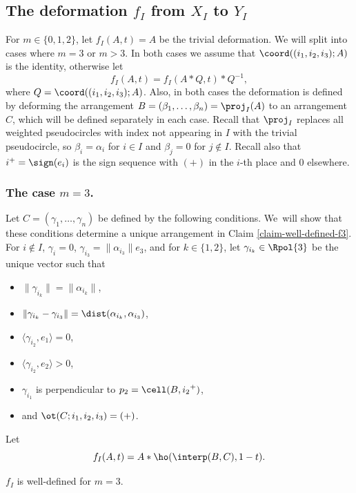 \subsection{The deformation $f_I$ from $X_I$ to $Y_I$}
\label{subsubsec-f}

For $m \in \{0,1,2\}$, let $f_I(A,t) = A$ be the trivial deformation.
We will split into cases where $m=3$ or $m >3$.
In both cases we assume that $\coord((i_1,i_2,i_3);A)$ is the identity, otherwise let
\[
f_I(A,t) = f_I(A*Q,t)*Q^{-1},
\]
where $Q = \coord((i_1,i_2,i_3);A)$.
Also, in both cases the deformation is defined by deforming the arrangement $B = (\beta_1,\dots,\beta_n) = \proj_I(A)$ to an arrangement $C$, which will be defined separately in each case. Recall that $\proj_I$ replaces all weighted pseudocircles with index not appearing in $I$ with the trivial pseudocircle, so $\beta_i = \alpha_i$ for $i \in I$ and $\beta_j = 0$ for $j \not\in I$.
Recall also that $i^+ = \sign(e_i)$ is the sign sequence with $(+)$ in the $i$-th place and $0$ elsewhere.

\subsubsection*{The case $m=3$.}
Let $C = (\gamma_1,\dots,\gamma_n)$ be defined by the following conditions. We~will show that these conditions determine a unique arrangement in Claim \ref{claim-well-defined-f3}.
For $i \not\in I$, $\gamma_i = 0$,
$\gamma_{i_3} = \|\alpha_{i_3}\|e_3$,
and for $k \in \{1,2\}$,
let
$\gamma_{i_k} \in \Rpol{3}$ be the unique vector such that
\begin{itemize}
\item
$\|\gamma_{i_k}\| = \|\alpha_{i_k}\|$,
\item
$\|\gamma_{i_k} -\gamma_{i_3}\| = \dist(\alpha_{i_k},\alpha_{i_3})$,
\item
$\langle \gamma_{i_2}, e_1 \rangle = 0$,
\item
$\langle \gamma_{i_2}, e_2 \rangle > 0$,
\item
$\gamma_{i_1}$ is perpendicular to $p_2 = \cell(B,{i_2}^+)$,
\item
and $\ot(C;i_1,i_2,i_3) = (+)$.
\end{itemize}
Let
\[ f_{I}(A,t) = A*\ho(\interp(B,C),1-t).\]

\begin{claim}\label{claim-well-defined-f3}
$f_I$ is well-defined for $m=3$.
\end{claim}


